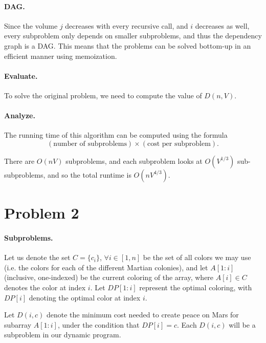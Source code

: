 \documentclass{6046}
\begin{document}
\vspace{-1em}
\paragraph{DAG.}
Since the volume $j$ decreases with every recursive
call, and $i$ decreases as well, every subproblem
only depends on smaller subproblems, and thus the
dependency graph is a DAG. This means that
the problems can be solved bottom-up in an 
efficient manner using memoization.

\vspace{-1em}
\paragraph{Evaluate.}
To solve the original problem, we need to compute the value of $D(n, V)$.

\vspace{-1em}
\paragraph{Analyze.}
The running time of this algorithm can be computed using
the formula
\[
    (\text{number of subproblems}) \times (\text{cost per subproblem}).
\]

There are $O(nV)$ subproblems, and each subproblem looks at
$O(V^{1/3})$ sub-subproblems, and so the total runtime is $O(nV^{4/3})$.


\section*{Problem 2}

\paragraph{Subproblems.}
Let us denote the set $C = \{c_i\}$, $\forall i \in [1, n]$
be the set of all colors we may use (i.e. the colors
for each of the different Martian colonies), and let
$A[1:i]$ (inclusive, one-indexed) be the current
coloring of the array, where $A[i] \in C$ denotes
the color at index $i$. Let $DP[1:i]$ represent
the optimal coloring, with $DP[i]$ denoting the
optimal color at index $i$.

Let $D(i, c)$ denote the minimum cost needed to
create peace on Mars for subarray $A[1:i]$,
under the condition that $DP[i] = c$. Each
$D(i, c)$ will be a subproblem in our dynamic
program.
\end{document}
